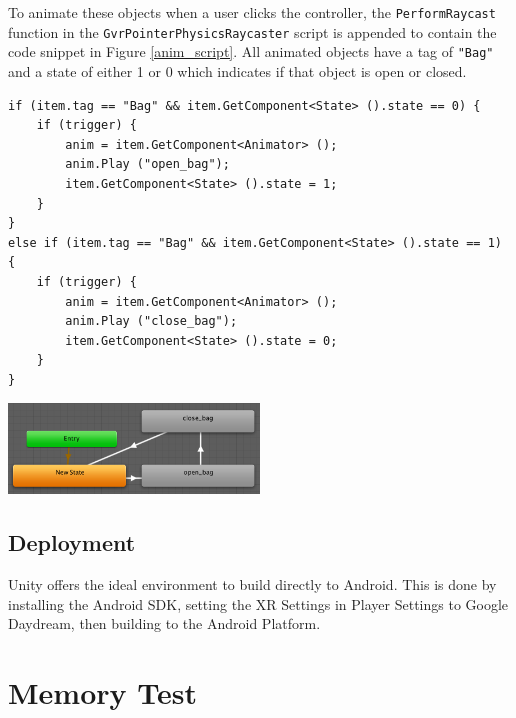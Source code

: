 \documentclass[ %
                    author={Elis Jones},
                supervisor={Dr. Kirsten Cater},
                    degree={BSc},
                     title={The Effect of Presentation Medium on Spatial Cognition},
                  subtitle={in the Virtual Environment},
                      year={2018} ]{dissertation}
\begin{document}
To animate these objects when a user clicks the controller, the \lstinline{PerformRaycast} function in the \lstinline{GvrPointerPhysicsRaycaster} script is appended to contain the code snippet in Figure \ref{anim_script}. All animated objects have a tag of \lstinline{"Bag"} and a state of either 1 or 0 which indicates if that object is open or closed. 

\begin{minipage}{\textwidth}
\begin{lstlisting}
if (item.tag == "Bag" && item.GetComponent<State> ().state == 0) {
	if (trigger) {
		anim = item.GetComponent<Animator> ();
		anim.Play ("open_bag");
		item.GetComponent<State> ().state = 1;
	}
}	
else if (item.tag == "Bag" && item.GetComponent<State> ().state == 1) {
	if (trigger) {
		anim = item.GetComponent<Animator> ();
		anim.Play ("close_bag");
		item.GetComponent<State> ().state = 0;
	} 
}

\end{lstlisting}
\label{anim_script}
\end{minipage}

\begin{minipage}{\textwidth}
    \centering
    \begin{center}
        \includegraphics[width=0.5\textwidth]{images/animator.png}
        \label{animator}
    \end{center}
\end{minipage}

\subsection{Deployment}
Unity offers the ideal environment to build directly to Android. This is done by installing the Android SDK, setting the XR Settings in Player Settings to Google Daydream, then building to the Android Platform. 


\section{Memory Test}
\end{document}
